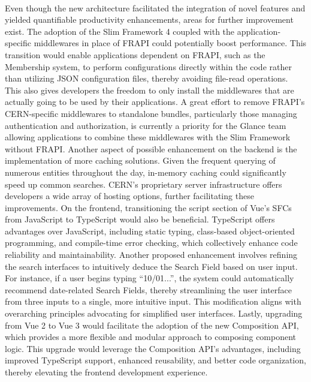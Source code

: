 \paragraph{} Even though the new architecture facilitated the integration of novel features and yielded quantifiable productivity enhancements, areas for further improvement exist. The adoption of the Slim Framework 4 coupled with the application-specific middlewares in place of FRAPI could potentially boost performance. This transition would enable applications dependent on FRAPI, such as the Membership system, to perform configurations directly within the code rather than utilizing JSON configuration files, thereby avoiding file-read operations. This also gives developers the freedom to only install the middlewares that are actually going to be used by their applications. A great effort to remove FRAPI's CERN-specific middlewares to standalone bundles, particularly those managing authentication and authorization, is currently a priority for the Glance team allowing applications to combine these middlewares with the Slim Framework without FRAPI. Another aspect of possible enhancement on the backend is the implementation of more caching solutions. Given the frequent querying of numerous entities throughout the day, in-memory caching could significantly speed up common searches. CERN's proprietary server infrastructure offers developers a wide array of hosting options, further facilitating these improvements. On the frontend, transitioning the script section of Vue's SFCs from JavaScript to TypeScript would also be beneficial. TypeScript offers advantages over JavaScript, including static typing, class-based object-oriented programming, and compile-time error checking, which collectively enhance code reliability and maintainability. Another proposed enhancement involves refining the search interfaces to intuitively deduce the Search Field based on user input. For instance, if a user begins typing ``10/01...'', the system could automatically recommend date-related Search Fields, thereby streamlining the user interface from three inputs to a single, more intuitive input. This modification aligns with overarching principles advocating for simplified user interfaces. Lastly, upgrading from Vue 2 to Vue 3 would facilitate the adoption of the new Composition API, which provides a more flexible and modular approach to composing component logic. This upgrade would leverage the Composition API's advantages, including improved TypeScript support, enhanced reusability, and better code organization, thereby elevating the frontend development experience.

